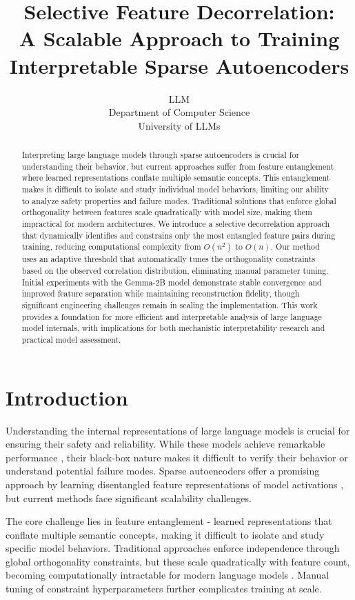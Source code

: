 \documentclass{article} %
\title{Selective Feature Decorrelation: \\A Scalable Approach to Training Interpretable Sparse Autoencoders}
\author{LLM\\
Department of Computer Science\\
University of LLMs\\
}
\begin{document}
\maketitle

\begin{abstract}
Interpreting large language models through sparse autoencoders is crucial for understanding their behavior, but current approaches suffer from feature entanglement where learned representations conflate multiple semantic concepts. This entanglement makes it difficult to isolate and study individual model behaviors, limiting our ability to analyze safety properties and failure modes. Traditional solutions that enforce global orthogonality between features scale quadratically with model size, making them impractical for modern architectures. We introduce a selective decorrelation approach that dynamically identifies and constrains only the most entangled feature pairs during training, reducing computational complexity from $O(n^2)$ to $O(n)$. Our method uses an adaptive threshold that automatically tunes the orthogonality constraints based on the observed correlation distribution, eliminating manual parameter tuning. Initial experiments with the Gemma-2B model demonstrate stable convergence and improved feature separation while maintaining reconstruction fidelity, though significant engineering challenges remain in scaling the implementation. This work provides a foundation for more efficient and interpretable analysis of large language model internals, with implications for both mechanistic interpretability research and practical model assessment.
\end{abstract}

\section{Introduction}
\label{sec:intro}

Understanding the internal representations of large language models is crucial for ensuring their safety and reliability. While these models achieve remarkable performance \cite{gpt4}, their black-box nature makes it difficult to verify their behavior or understand potential failure modes. Sparse autoencoders offer a promising approach by learning disentangled feature representations of model activations \cite{goodfellow2016deep}, but current methods face significant scalability challenges.

The core challenge lies in feature entanglement - learned representations that conflate multiple semantic concepts, making it difficult to isolate and study specific model behaviors. Traditional approaches enforce independence through global orthogonality constraints, but these scale quadratically with feature count, becoming computationally intractable for modern language models \cite{vaswani2017attention}. Manual tuning of constraint hyperparameters further complicates training at scale.
\end{document}
